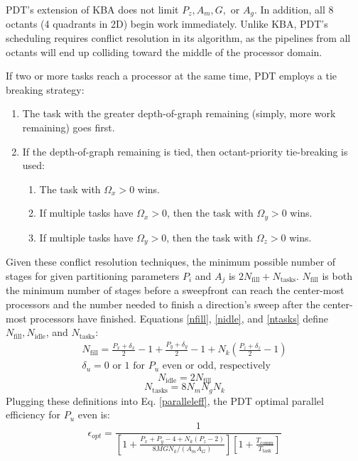 \documentclass[times,final]{elsarticle}
\begin{document}
PDT's extension of KBA does not limit $P_z, A_m, G,$ or $A_g$. 
In addition, all 8 octants (4 quadrants in 2D) begin work immediately.
Unlike KBA, PDT's scheduling requires conflict resolution in its algorithm, as the pipelines from all octants will end up colliding toward the middle of the processor domain.

If two or more tasks reach a processor at the same time, PDT employs a tie breaking strategy:
\begin{enumerate}
	\item The task with the greater depth-of-graph remaining (simply, more work remaining) goes first.
	\item If the depth-of-graph remaining is tied, then octant-priority tie-breaking is used:
	\begin{enumerate}
	  \item The task with $\Omega_x > 0$ wins.
	  \item If multiple tasks have $\Omega_x > 0$, then the task with $\Omega_y > 0$ wins.
	  \item If multiple tasks have $\Omega_y > 0$, then the task with $\Omega_z > 0$ wins.
	\end{enumerate}
\end{enumerate}

Given these conflict resolution techniques, the minimum possible number of stages for given partitioning parameters $P_i$ and $A_j$ is $2N_{\text{fill}} + N_{\text{tasks}}$.
$N_{\text{fill}}$ is both the minimum number of stages before a sweepfront can reach the center-most processors and the number needed to finish a direction's sweep after the center-most processors have finished.
Equations \ref{nfill}, \ref{nidle}, and \ref{ntasks} define $N_{\text{fill}}, N_{\text{idle}}$, and $N_{\text{tasks}}$:
\begin{align}
N_\text{fill} = \frac{P_x + \delta_x}{2} - 1 + \frac{P_y + \delta_y}{2} - 1 + N_k (\frac{P_z + \delta_z}{2} - 1)\label{nfill} \\
\delta_u = 0 \text{ or } 1 \text{ for $P_u$ even or odd, respectively} \nonumber
\end{align}
\begin{equation}
N_\text{idle} = 2N_{\text{fill}}
\label{nidle}
\end{equation}
\begin{equation}
N_\text{tasks} = 8N_mN_gN_k
\label{ntasks}
\end{equation}
Plugging these definitions into Eq. \ref{paralleleff}, the PDT optimal parallel efficiency \cite{mpadams2013} for $P_u$ even is:
\begin{equation}
	\epsilon_{opt} = \frac{1}{ [1 + \frac{P_x + P_y - 4 + N_k(P_z -2)}{8MGN_k/(A_m A_G)} ]  [ 1 +  \frac{T_{\text{comm}}}{T_{\text{task}}} ]}
	\label{eps_opt}
\end{equation}
\end{document}
